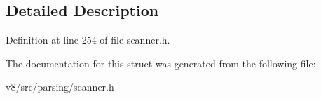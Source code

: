 \subsection{Detailed Description}


Definition at line 254 of file scanner.\+h.



The documentation for this struct was generated from the following file\+:\begin{DoxyCompactItemize}
\item 
v8/src/parsing/scanner.\+h\end{DoxyCompactItemize}
